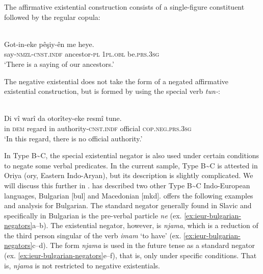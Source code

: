 \documentclass[output=paper]{langsci/langscibook}
\begin{document}
The affirmative existential construction consists of a single-figure constituent followed by the regular copula:

\begin{exe}\ex\label{ex:ieur-kurmanji-ancestors}
\\
    \gll Got-in-eke pêşiy-ên      me   heye.  \\
say-\textsc{nmzl}-\textsc{cnst}.\textsc{indf} ancestor-\textsc{pl} \textsc{1pl.obl}   be.\textsc{prs.3sg} \\
    \glt `There is a saying of our ancestors.' 
    \end{exe}

The negative existential does not take the form of a negated affirmative existential construction, but is formed by using the special verb \textit{tun-}:

\begin{exe}\ex\label{ex:ieur-kurmanji-authority}
\\
    \gll Di vî warî    da otorîtey-eke resmî   tune.  \\
in  \textsc{dem}    regard in  authority-\textsc{cnst}.\textsc{indf}  official \textsc{cop.neg.prs.3sg} \\
    \glt `In this regard, there is no official authority.' 
    \end{exe}

In Type B{\textasciitilde}C, the special existential negator is also used
under certain conditions to negate some verbal predicates. In the current
sample, Type B{\textasciitilde}C is attested in Oriya (ory, Eastern
Indo-Aryan), but its description is slightly complicated. We will discuss
this further in . \citet{Veselinova2014} has
described two other Type B{\textasciitilde}C Indo-European languages,
Bulgarian [bul] and Macedonian [mkd]. \citet[1332--1333]{Veselinova2014}
offers the following examples and analysis for Bulgarian. The standard
negator generally found in Slavic and specifically in Bulgarian is the
pre-verbal particle \textit{ne} (ex.
\ref{ex:ieur-bulgarian-negators}a--b). The existential negator,
however, is \textit{njama}, which is a reduction of the third person
singular of the verb \textit{imam} `to have' (ex.
\ref{ex:ieur-bulgarian-negators}c--d). The form
\textit{njama} is used in the future tense as a standard negator (ex.
\ref{ex:ieur-bulgarian-negators}e--f), that is, only under specific conditions. That is, \textit{njama} is
not restricted to negative existentials.
\end{document}
